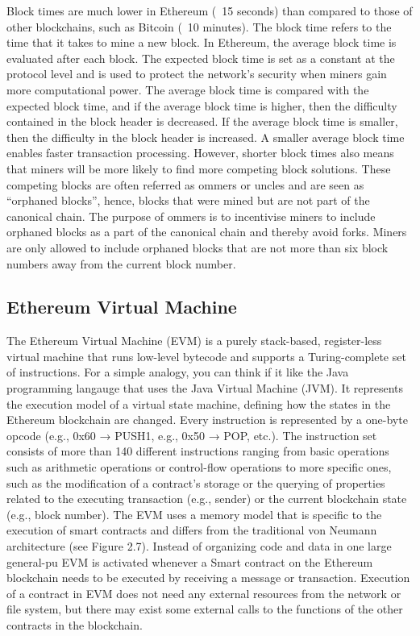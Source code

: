         Block times are much lower in Ethereum (~15 seconds) than compared to those of other blockchains, such as Bitcoin (~10 minutes).
        The block time refers to the time that it takes to mine a new block.
        In Ethereum, the average block time is evaluated after each block.
        The expected block time is set as a constant at the protocol level and is used to protect the network's security when miners gain more computational power.
        The average block time is compared with the expected block time, and if the average block time is higher, then the difficulty contained in the block header is decreased.
        If the average block time is smaller, then the difficulty in the block header is increased.
        A smaller average block time enables faster transaction processing.
        However, shorter block times also means that miners will be more likely to find more competing block solutions.
        These competing blocks are often referred as ommers or uncles and are seen as “orphaned blocks”, hence, blocks that were mined but are not part of the canonical chain.
        The purpose of ommers is to incentivise miners to include orphaned blocks as a part of the canonical chain and thereby avoid forks.
        Miners are only allowed to include orphaned blocks that are not more than six block numbers away from the current block number.

    \subsection{Ethereum Virtual Machine}
        The Ethereum Virtual Machine (EVM) is a purely stack-based, register-less virtual machine that runs low-level bytecode and supports a Turing-complete set of instructions.
        For a simple analogy, you can think if it like the Java programming langauge that uses the Java Virtual Machine (JVM).
        It represents the execution model of a virtual state machine, defining how the states in the Ethereum blockchain are changed.
        Every instruction is represented by a one-byte opcode (e.g., 0x60 → PUSH1, e.g., 0x50 → POP, etc.).
        The instruction set consists of more than 140 different instructions ranging from basic operations such as arithmetic operations or control-flow operations to more specific ones, such as the modification of a contract's storage or the querying of properties related to the executing transaction (e.g., sender) or the current blockchain state (e.g., block number).
        The EVM uses a memory model that is specific to the execution of smart contracts and differs from the traditional von Neumann architecture (see Figure 2.7). Instead of organizing code and data in one large general-pu
        EVM is activated whenever a Smart contract on the Ethereum blockchain needs to be executed by receiving a message or transaction.
        Execution of a contract in EVM does not need any external resources from the network or file system, but there may exist some external calls to the functions of the other contracts in the blockchain.
        
